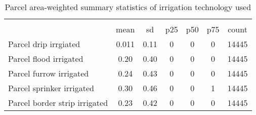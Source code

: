 \begin{table}[htbp]\centering
\def\sym#1{\ifmmode^{#1}\else\(^{#1}\)\fi}
\caption{Parcel area-weighted summary statistics of irrigation technology used}
\begin{tabular*}{1.0\hsize}{@{\hskip\tabcolsep\extracolsep\fill}l*{1}{cccccc}}
\toprule
                                    &\multicolumn{6}{c}{}                                                         \\
                                    &        mean&          sd&         p25&         p50&         p75&       count\\
\midrule
Parcel drip irrgiated               &       0.011&        0.11&           0&           0&           0&       14445\\
Parcel flood irrigated              &        0.20&        0.40&           0&           0&           0&       14445\\
Parcel furrow irrigated             &        0.24&        0.43&           0&           0&           0&       14445\\
Parcel sprinker irrigated           &        0.30&        0.46&           0&           0&           1&       14445\\
Parcel border strip irrigated       &        0.23&        0.42&           0&           0&           0&       14445\\
\bottomrule
\end{tabular*}
\end{table}
